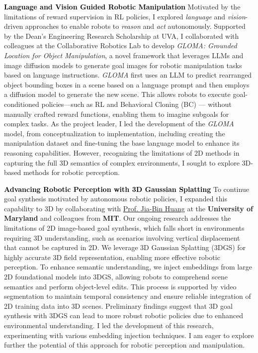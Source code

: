 \documentclass[10pt]{article}
\newcommand{\statement}[1]{\medskip\noindent
  \textcolor{black}{\textbf{#1}}\space
}
\begin{document}
\statement{Language and Vision Guided Robotic Manipulation} Motivated by the limitations of reward supervision in RL policies, I explored \textit{language} and \textit{vision}-driven approaches to enable robots to \textit{reason} and \textit{act} autonomously. Supported by the Dean's Engineering Research Scholarship at UVA, I collaborated with colleagues at the Collaborative Robotics Lab to develop \textit{GLOMA: Grounded Location for Object Manipulation}, a novel framework that leverages LLMs and image diffusion models to generate goal images for robotic manipulation tasks based on language instructions. \textit{GLOMA} first uses an LLM to predict rearranged object bounding boxes in a scene based on a language prompt and then employs a diffusion model to generate the new scene. This allows robots to execute goal-conditioned policies—such as RL and Behavioral Cloning (BC) — without manually crafted reward functions, enabling them to imagine subgoals for complex tasks. As the project leader, I led the development of the \textit{GLOMA} model, from conceptualization to implementation, including creating the manipulation dataset and fine-tuning the base language model to enhance its reasoning capabilities. However, recognizing the limitations of 2D methods in capturing the full 3D semantics of complex environments, I sought to explore 3D-based methods for robotic perception.

\statement{Advancing Robotic Perception with 3D Gaussian Splatting} To continue goal synthesis motivated by autonomous robotic policies, I expanded this capability to 3D by collaborating with \href{https://jbhuang0604.github.io/}{Prof. Jia-Bin Huang} at the \textbf{University of Maryland} and colleagues from \textbf{MIT}. Our ongoing research addresses the limitations of 2D image-based goal synthesis, which falls short in environments requiring 3D understanding, such as scenarios involving vertical displacement that cannot be captured in 2D. We leverage 3D Gaussian Splatting (3DGS) for highly accurate 3D field representation, enabling more effective robotic perception. To enhance semantic understanding, we inject embeddings from large 2D foundational models into 3DGS, allowing robots to comprehend scene semantics and perform object-level edits. This process is supported by video segmentation to maintain temporal consistency and ensure reliable integration of 2D training data into 3D scenes. Preliminary findings suggest that 3D goal synthesis with 3DGS can lead to more robust robotic policies due to enhanced environmental understanding. I led the development of this research, experimenting with various embedding injection techniques. I am eager to explore further the potential of this approach for robotic perception and manipulation.
\end{document}
